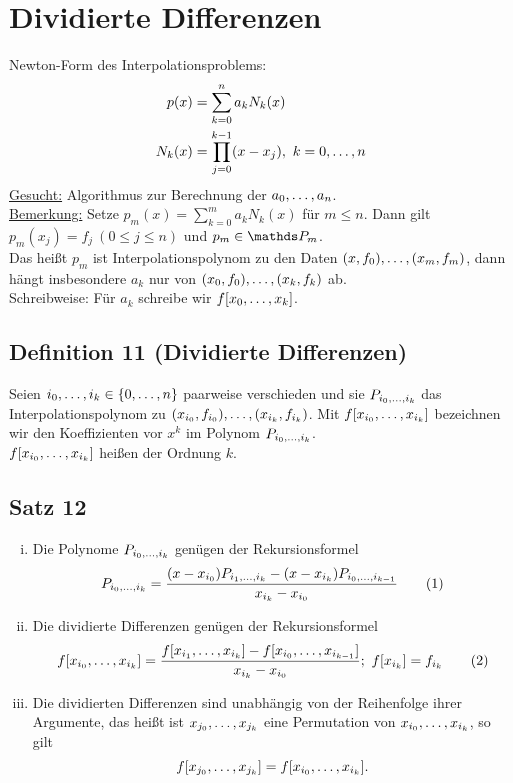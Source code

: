 \section{Dividierte Differenzen}
\label{sec:dividierte_differenzen}
Newton-Form des Interpolationsproblems:
\begin{equation*}
\begin{aligned}
	p(x) &= \sum_{k=0}^{n}a_kN_k(x)\\
	N_k(x) &= \prod_{j=0}^{k-1}(x-x_j),~k=0, \dots ,n
\end{aligned}
\end{equation*}
\uline{Gesucht:}
Algorithmus zur Berechnung der $a_0, \dots ,a_n$.\\
\uline{Bemerkung:}
Setze $p_m(x)=\sum_{k=0}^{m}a_kN_k(x)$ für $m\le n$.
Dann gilt $p_m(x_j)=f_j~(0\le j\le n)$ und $p_m\in \Pw_m$.\\
Das heißt $p_m$ ist Interpolationspolynom zu den Daten $(x,f_0), \dots ,(x_m,f_m)$, dann hängt insbesondere $a_k$ nur von $(x_0,f_0), \dots ,(x_k,f_k)$ ab.\\
Schreibweise:
Für $a_k$ schreibe wir $f[x_0, \dots ,x_k]$.

\subsection{Definition 11 (Dividierte Differenzen)}
\label{sub:def_11}
Seien $i_0, \dots ,i_k\in \{0, \dots ,n\}$ paarweise verschieden und sie $P_{i_0, \dots ,i_k}$ das Interpolationspolynom zu $(x_{i_0},f_{i_0}), \dots ,(x_{i_k},f_{i_k})$.
Mit $f[x_{i_0}, \dots ,x_{i_k}]$ bezeichnen wir den Koeffizienten vor $x^k$ im Polynom $P_{i_0, \dots ,i_k}$.\\
$f[x_{i_0}, \dots ,x_{i_k}]$ heißen  der Ordnung $k$.

\subsection{Satz 12}
\label{sub:satz_12}
\begin{enumerate}[(i)]
	\item Die Polynome $P_{i_0, \dots ,i_k}$ genügen der Rekursionsformel
	\[
	P_{i_0, \dots ,i_k} = \frac{(x-x_{i_0})P_{i_1, \dots ,i_k}-(x-x_{i_k})P_{i_0, \dots ,i_{k-1}}}{x_{i_k}-x_{i_0}} \tag{1}
	\]
	\item Die dividierte Differenzen genügen der Rekursionsformel
	\[
	f[x_{i_0}, \dots ,x_{i_k}] = \frac{f[x_{i_1}, \dots ,x_{i_k}]-f[x_{i_0}, \dots ,x_{i_{k-1}}]}{x_{i_k}-x_{i_0}};~ f[x_{i_k}]=f_{i_k} \tag{2}
	\]
	\item Die dividierten Differenzen sind unabhängig von der Reihenfolge ihrer Argumente, das heißt ist $x_{j_0}, \dots ,x_{j_k}$ eine Permutation von $x_{i_0}, \dots ,x_{i_k}$, so gilt
	\[
	f[x_{j_0}, \dots ,x_{j_k}]= f[x_{i_0}, \dots ,x_{i_k}].
	\]
\end{enumerate}

